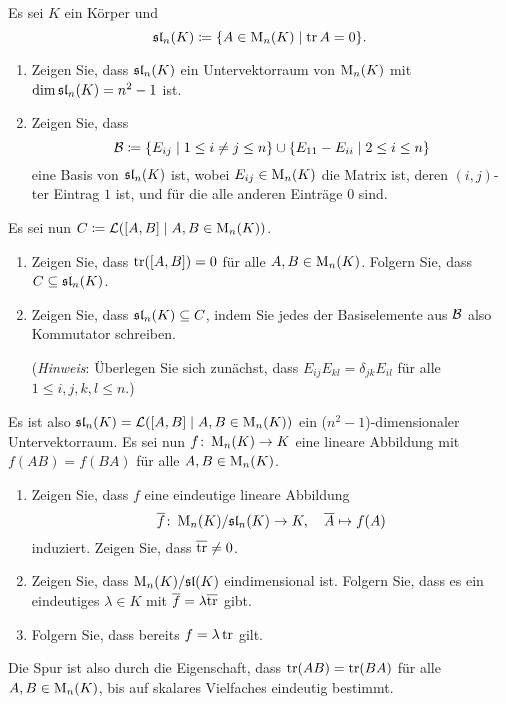 \begin{question}[subtitle = Alternative Beschreibung der Spur]{4}
  Es sei $K$ ein Körper und
  \[
              \mathfrak{sl}_n(K)
    \coloneqq \{ A \in \operatorname{M}_n(K) \mid \operatorname{tr} A = 0 \}.
  \]
  \begin{enumerate}[leftmargin=*]
    \item
      Zeigen Sie, dass $\mathfrak{sl}_n(K)$ ein Untervektorraum von $\operatorname{M}_n(K)$ mit $\dim \mathfrak{sl}_n(K) = n^2 - 1$ ist.
    \item
      Zeigen Sie, dass
      \[
        \mathcal{B}
        \coloneqq
              \{ E_{ij} \mid 1 \leq i \neq j \leq n \}
        \cup  \{ E_{11} - E_{ii} \mid 2 \leq i \leq n \}
      \]
      eine Basis von $\mathfrak{sl}_n(K)$ ist, wobei $E_{ij} \in \operatorname{M}_n(K)$ die Matrix ist, deren $(i,j)$-ter Eintrag $1$ ist, und für die alle anderen Einträge $0$ sind.
  \end{enumerate}
  Es sei nun $C \coloneqq \operatorname{\mathcal{L}}( [A,B] \mid A, B \in \operatorname{M}_n(K) )$.
  \begin{enumerate}[leftmargin=*, resume]
    \item
      Zeigen Sie, dass $\operatorname{tr}([A,B]) = 0$ für alle $A, B \in \operatorname{M}_n(K)$.
      Folgern Sie, dass $C \subseteq \mathfrak{sl}_n(K)$.
    \item
      Zeigen Sie, dass $\mathfrak{sl}_n(K) \subseteq C$, indem Sie jedes der Basiselemente aus $\mathcal{B}$ also Kommutator schreiben.
      
      (\emph{Hinweis}:
       Überlegen Sie sich zunächst, dass $E_{ij} E_{kl} = \delta_{jk} E_{il}$ für alle $1 \leq i, j, k, l \leq n$.)
  \end{enumerate}
  Es ist also $\mathfrak{sl}_n(K) = \operatorname{\mathcal{L}}( [A,B] \mid A, B \in \operatorname{M}_n(K) )$ ein ($n^2 - 1$)-dimensionaler Untervektorraum.
  Es sei nun $f \colon \operatorname{M}_n(K) \to K$ eine lineare Abbildung mit $f(AB) = f(BA)$ für alle $A, B \in \operatorname{M}_n(K)$.
  \begin{enumerate}[leftmargin=*, resume]
    \item
      Zeigen Sie, dass $f$ eine eindeutige lineare Abbildung
      \[
        \overline{f} \colon \operatorname{M}_n(K) / \mathfrak{sl}_n(K) \to K,
        \quad
        \overline{A} \mapsto f(A)
      \]
      induziert.
      Zeigen Sie, dass $\overline{\operatorname{tr}} \neq 0$.
    \item
      Zeigen Sie, dass $\operatorname{M}_n(K) / \mathfrak{sl}(K)$ eindimensional ist.
      Folgern Sie, dass es ein eindeutiges $\lambda \in K$ mit $\overline{f} = \lambda \overline{\operatorname{tr}}$ gibt.
    \item
      Folgern Sie, dass bereits $f = \lambda \operatorname{tr}$ gilt.
  \end{enumerate}
  Die Spur ist also durch die Eigenschaft, dass $\operatorname{tr}(AB) = \operatorname{tr}(BA)$ für alle $A, B \in \operatorname{M}_n(K)$, bis auf skalares Vielfaches eindeutig bestimmt.
\end{question}